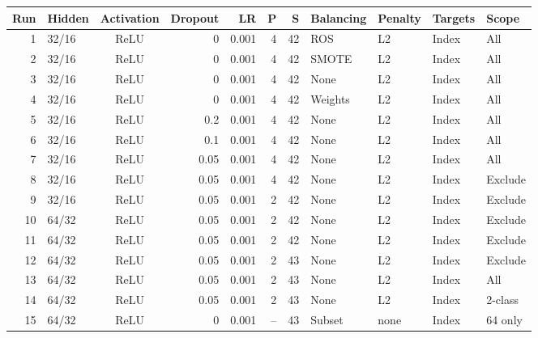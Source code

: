 \documentclass[11pt,letterpaper]{article}
\begin{document}
\par\noindent\begin{minipage}{\textwidth}
\label{tab:settings}
\centering\scriptsize
\setlength{\tabcolsep}{3pt}
\renewcommand{\arraystretch}{1.08}
\begin{tabular*}{\textwidth}{@{\extracolsep{\fill}}rlcrrrrllll@{}}
\toprule
Run & Hidden & Activation & Dropout & LR & P & S & Balancing & Penalty & Targets & Scope \\
\midrule
1 & 32/16 & ReLU & 0 & 0.001 & 4 & 42 & ROS & L2 & Index & All \\
2 & 32/16 & ReLU & 0 & 0.001 & 4 & 42 & SMOTE & L2 & Index & All \\
3 & 32/16 & ReLU & 0 & 0.001 & 4 & 42 & None & L2 & Index & All \\
4 & 32/16 & ReLU & 0 & 0.001 & 4 & 42 & Weights & L2 & Index & All \\
5 & 32/16 & ReLU & 0.2 & 0.001 & 4 & 42 & None & L2 & Index & All \\
6 & 32/16 & ReLU & 0.1 & 0.001 & 4 & 42 & None & L2 & Index & All \\
7 & 32/16 & ReLU & 0.05 & 0.001 & 4 & 42 & None & L2 & Index & All \\
8 & 32/16 & ReLU & 0.05 & 0.001 & 4 & 42 & None & L2 & Index & Exclude \\
9 & 32/16 & ReLU & 0.05 & 0.001 & 2 & 42 & None & L2 & Index & Exclude \\
10 & 64/32 & ReLU & 0.05 & 0.001 & 2 & 42 & None & L2 & Index & Exclude \\
11 & 64/32 & ReLU & 0.05 & 0.001 & 2 & 42 & None & L2 & Index & Exclude \\
12 & 64/32 & ReLU & 0.05 & 0.001 & 2 & 43 & None & L2 & Index & Exclude \\
13 & 64/32 & ReLU & 0.05 & 0.001 & 2 & 43 & None & L2 & Index & All \\
14 & 64/32 & ReLU & 0.05 & 0.001 & 2 & 43 & None & L2 & Index & 2-class \\
15 & 64/32 & ReLU & 0 & 0.001 & -- & 43 & Subset & none & Index & 64 only \\

\end{tabular*}
\end{minipage}
\end{document}
